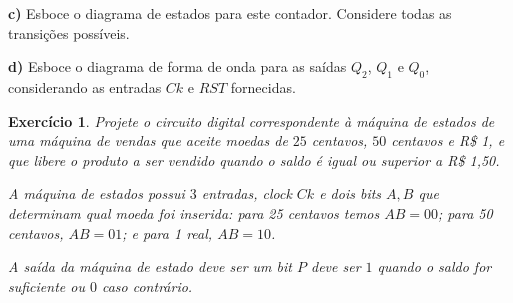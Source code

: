 \documentclass[a4paper,12pt,notitlepage]{article}
\newtheorem{exer}{Exercício}
\begin{document}
\noindent
\textbf{c)} Esboce o diagrama de estados para este contador. Considere todas
as transições possíveis.

\vfill

\noindent
\textbf{d)} Esboce o diagrama de forma de onda para as saídas $Q_2$, $Q_1$
e $Q_0$, considerando as entradas $Ck$ e $RST$ fornecidas.

\newcommand{\clockcycle}[2]{\draw[very thick] (#1,#2) -- (#1+1,#2) -- (#1+1,#2+1) -- (#1+2,#2+1) -- (#1+2,#2) -- (#1+3,#2);}%

\begin{center}
\end{center}

\newpage

\begin{exer}
  Projete o circuito digital correspondente à máquina de estados de uma
  máquina de vendas que aceite moedas de $25$ centavos, $50$ centavos e
  R\$ 1, e que libere o produto a ser vendido quando o saldo é igual ou
  superior a R\$ 1,50.

  A máquina de estados possui $3$ entradas, clock $Ck$
  e dois bits $A, B$ que determinam qual moeda foi inserida: para 25 centavos
  temos $AB = 00$; para 50 centavos, $AB =01$; e para 1 real, $AB = 10$.

  A saída da máquina de estado deve ser um bit $P$ deve ser $1$ quando o
  saldo for suficiente ou $0$ caso contrário.
\end{exer}
\end{document}
